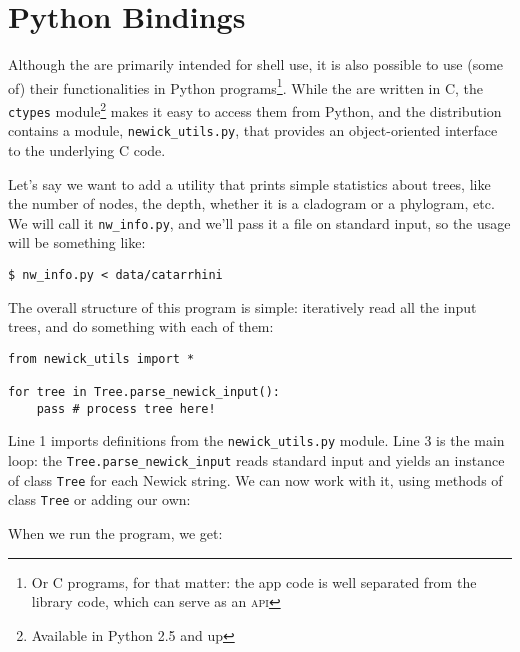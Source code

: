 
\chapter{Python Bindings}
\label{chap_python_lib}

Although the \nutils{} are primarily intended for shell use, it is also
possible to use (some of) their functionalities in Python programs\footnote{Or
C programs, for that matter: the app code is well separated from the library
code, which can serve as an \textsc{api}}. While the \nutils{} are written in
C, the \texttt{ctypes} module\footnote{Available in Python 2.5 and up} makes it
easy to access them from Python, and the distribution contains a module,
\texttt{newick\_utils.py}, that provides an object-oriented interface to the
underlying C code.

Let's say we want to add a utility that prints simple statistics about trees,
like the number of nodes, the depth, whether it is a cladogram or a phylogram,
etc. We will call it \texttt{nw\_info.py}, and we'll pass it a \nw{}
file on standard input, so the usage will be something like:

\begin{verbatim}
$ nw_info.py < data/catarrhini
\end{verbatim}

\noindent{}The overall structure of this program is simple: iteratively read
all the input trees, and do something with each of them:

\begin{lstlisting}
from newick_utils import *

for tree in Tree.parse_newick_input():
    pass # process tree here!
\end{lstlisting}

\noindent{}Line 1 imports definitions from the \texttt{newick\_utils.py}
module. Line 3 is the main loop: the \texttt{Tree.parse\_newick\_input}
reads standard input and yields an instance of class \texttt{Tree} for each
Newick string. We can now work with it, using methods of class \texttt{Tree} or adding our own:



\noindent{}When we run the program, we get:

